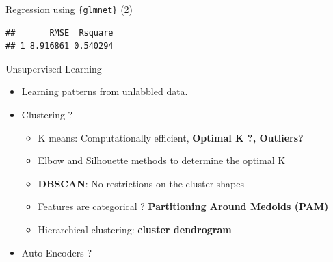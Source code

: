 \documentclass[12pt,ignorenonframetext,]{beamer}
\newenvironment{Shaded}{\begin{snugshade}}{\end{snugshade}}
\newcommand{\CommentTok}[1]{\textcolor[rgb]{0.56,0.35,0.01}{\textit{#1}}}
\newcommand{\DataTypeTok}[1]{\textcolor[rgb]{0.13,0.29,0.53}{#1}}
\newcommand{\KeywordTok}[1]{\textcolor[rgb]{0.13,0.29,0.53}{\textbf{#1}}}
\newcommand{\NormalTok}[1]{#1}
\newcommand{\OperatorTok}[1]{\textcolor[rgb]{0.81,0.36,0.00}{\textbf{#1}}}
\newcommand{\StringTok}[1]{\textcolor[rgb]{0.31,0.60,0.02}{#1}}
\providecommand{\tightlist}{%
  \setlength{\itemsep}{0pt}\setlength{\parskip}{0pt}}
\begin{document}
\begin{frame}[fragile]{Regression using \texttt{\{glmnet\}} (2)}
\protect\hypertarget{regression-using-2-1}{}

\tiny

\begin{Shaded}
\end{Shaded}

\begin{verbatim}
##       RMSE  Rsquare
## 1 8.916861 0.540294
\end{verbatim}

\normalsize

\end{frame}

\begin{frame}{Unsupervised Learning}
\protect\hypertarget{unsupervised-learning}{}

\begin{itemize}
\tightlist
\item
  Learning patterns from unlabbled data. \vspace{2mm}
\item
  Clustering ? \vspace{2mm}

  \begin{itemize}
      \item K means: Computationally efficient, \textbf{Optimal K ?, Outliers?}
      \item Elbow and Silhouette methods to determine the optimal K
      \item \textbf{DBSCAN}: No restrictions on the cluster shapes
      \item Features are categorical ? \textbf{Partitioning Around Medoids (PAM)}
      \item Hierarchical clustering: \textbf{cluster dendrogram}
    \end{itemize}
  \vspace{2mm}
\item
  Auto-Encoders ?
\end{itemize}

\end{frame}
\end{document}
